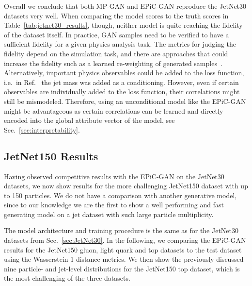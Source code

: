 \documentclass[a4paper,submission, Phys]{SciPost}
\DeclareRobustCommand{\Sec}[1]{Sec.~\ref{sec:#1}}
\DeclareRobustCommand{\Tab}[1]{Table~\ref{tab:#1}}
\DeclareRobustCommand{\Reff}[1]{Ref.~\cite{#1}}
\begin{document}
Overall we conclude that both MP-GAN and EPiC-GAN reproduce the JetNet30 datasets very well.
%
When comparing the model scores to the truth scores in \Tab{jetnet30_results}, though, neither model is quite reaching the fidelity of the dataset itself.
%
In practice, GAN samples need to be verified to have a sufficient fidelity for a given physics analysis task. 
% 
The metrics for judging the fidelity depend on the simulation task, and there are approaches that could increase the fidelity such as a learned re-weighting of generated samples~\cite{DCTRGAN_Diefenbacher_2020}.
%
Alternatively, important physics observables could be added to the loss function, i.e.\ in \Reff{JetFlow} the jet mass was added as a conditioning. 
%
However, even if certain observables are individually added to the loss function, their correlations might still be mismodeled. 
%
Therefore, using an unconditional model like the EPiC-GAN might be advantageous as certain correlations can be learned and directly encoded into the global attribute vector of the model, see \Sec{interpretability}.

\subsection{JetNet150 Results}
\label{sec:JetNet150}

Having observed competitive results with the EPiC-GAN on the JetNet30 datasets, we now show results for the more challenging JetNet150 dataset with up to 150 particles.
%
We do not have a comparison with another generative model, since to our knowledge we are the first to show a well performing and fast generating model on a jet dataset with such large particle multiplicity. 

The model architecture and training procedure is the same as for the JetNet30 datasets from \Sec{JetNet30}. 
%
In the following, we comparing the EPiC-GAN results for the JetNet150 gluon, light quark and top datasets to the test dataset using the Wasserstein-1 distance metrics.
%
We then show the previously discussed nine particle- and jet-level distributions for the JetNet150 top dataset, which is the most challenging of the three datasets.

\end{document}
